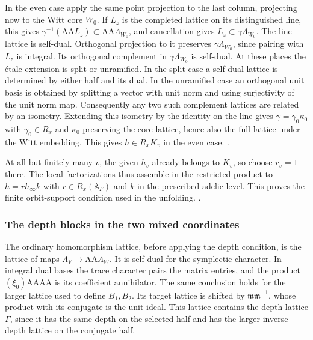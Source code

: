 In the even case apply the same point projection to the
last column, projecting now to the Witt core \(W_0\).
If \(L_z\) is the completed lattice on its distinguished
line, this gives \(\gamma^{-1}(\mathrm{AA}L_z)
\subset\mathrm{AA}\Lambda_{W_0}\), and cancellation gives
\(L_z\subset\gamma\Lambda_{W_0}\).
The line lattice is self-dual. Orthogonal projection to it
preserves \(\gamma\Lambda_{W_0}\), since pairing with
\(L_z\) is integral. Its orthogonal complement in
\(\gamma\Lambda_{W_0}\) is self-dual. At these places the
étale extension is split or unramified. In the split case
a self-dual lattice is determined by either half and its
dual. In the unramified case an orthogonal unit basis is
obtained by splitting a vector with unit norm and using
surjectivity of the unit norm map. Consequently any two
such complement lattices are related by an isometry.
Extending this isometry by the identity on the line gives
\(\gamma=\gamma_0\kappa_0\) with \(\gamma_0\in R_x\) and
\(\kappa_0\) preserving the core lattice, hence also the
full lattice under the Witt embedding. This gives
\(h\in R_xK_v\) in the even case.
.

At all but finitely many \(v\), the given \(h_v\) already
belongs to \(K_v\), so choose \(r_v=1\) there. The local
factorizations thus assemble in the restricted product
to \(h=r h_\infty k\) with \(r\in R_x(\mathbb A_F)\)
and \(k\) in the prescribed adelic level. This proves the
finite orbit-support condition used in the unfolding.
.

\subsubsection{The depth blocks in the two mixed coordinates}
The ordinary homomorphism lattice, before applying
the depth condition, is the lattice of maps
\(\Lambda_V\to\mathrm{AA}\Lambda_W\). It is self-dual
for the symplectic character. In integral dual bases the
trace character pairs the matrix entries, and the product
\((\xi_0)\mathrm{AA}\overline{\mathrm{AA}}\) is its
coefficient annihilator. The same conclusion holds for
the larger lattice used to define \(B_1,B_2\).
Its target lattice is shifted by
\(\mathfrak m\overline{\mathfrak m}^{-1}\), whose
product with its conjugate is the unit ideal. This
lattice contains the depth lattice \(\Gamma\), since it
has the same depth on the selected half and has the larger
inverse-depth lattice on the conjugate half.

